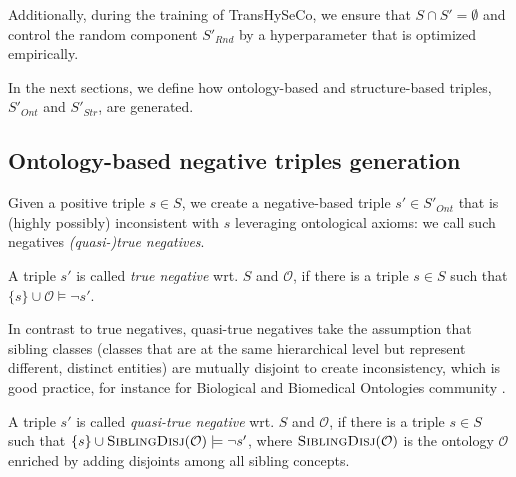 \documentclass[sigconf]{acmart}
\newcommand{\TransHI}{TransHySeCo\xspace}
\begin{document}
\noindent Additionally, during the training of \TransHI, we ensure that \(S\cap S'=\emptyset\) and control the random component $S'_{Rnd}$ by a hyperparameter that is  optimized  empirically. 

In the  next sections, we define how ontology-based and structure-based triples, $S'_{Ont}$ and $S'_{Str}$, are generated.

\subsection{Ontology-based negative triples generation}
\label{sect:ontology-negative}

Given a positive triple $s\in S$, we create a negative-based triple $s'\in S'_{Ont}$ that is (highly possibly) inconsistent with $s$ leveraging ontological axioms: we call such negatives \emph{(quasi-)true negatives}.
\begin{definition}
     A triple $s'$ is called \emph{true negative} wrt.  $S$ and  $\mathcal{O}$, if there is a triple $s\in S$ such that $\{s\}\cup\mathcal{O}\models \neg s'$.
\end{definition} 

In contrast to true negatives, quasi-true negatives take the assumption that sibling classes (classes that are at the same hierarchical level but represent different, distinct entities) are mutually disjoint to create inconsistency,  which is good practice, for instance for Biological and Biomedical Ontologies community \cite{bioinformatics/btt491}. 
\begin{definition}
  A triple $s'$ is called \emph{quasi-true negative} wrt.  $S$ and $\mathcal{O}$, if there is a triple $s\in S$ such that $\{s\}\cup\textsc{SiblingDisj}(\mathcal{O})\models \neg s'$, where $\textsc{SiblingDisj}(\mathcal{O}) $ is the ontology $\mathcal{O}$ enriched by adding disjoints among all sibling concepts.
\end{definition}
\end{document}
